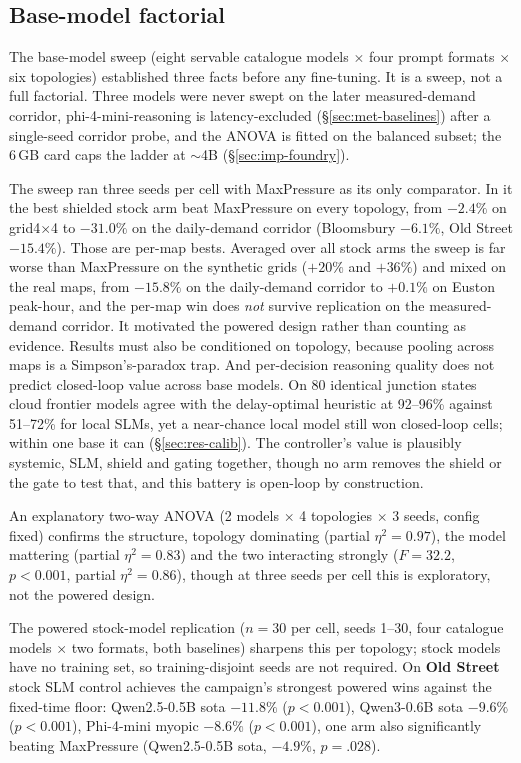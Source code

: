 \subsection{Base-model factorial}\label{sec:res-factorial}
The base-model sweep (eight servable catalogue models $\times$ four prompt
formats $\times$ six topologies) established three facts before any
fine-tuning. It is a sweep, not a full factorial. Three models were never
swept on the later measured-demand corridor, phi-4-mini-reasoning is
latency-excluded (\S\ref{sec:met-baselines}) after a single-seed corridor
probe, and the ANOVA is fitted on the balanced subset; the 6\,GB card caps
the ladder at $\sim$4B (\S\ref{sec:imp-foundry}).

The sweep ran three seeds per cell with MaxPressure as its only
comparator. In it the best shielded stock arm beat MaxPressure on every
topology, from $-2.4\%$ on grid4$\times$4 to $-31.0\%$ on the daily-demand
corridor (Bloomsbury $-6.1\%$, Old Street $-15.4\%$). Those are per-map
bests. Averaged over all stock arms the sweep is far worse than MaxPressure
on the synthetic grids ($+20\%$ and $+36\%$) and mixed on the real maps,
from $-15.8\%$ on the daily-demand corridor to $+0.1\%$ on Euston
peak-hour, and the per-map win does \emph{not} survive replication on the
measured-demand corridor. It motivated the powered design rather than
counting as evidence. Results must also be conditioned on topology,
because pooling across maps is a Simpson's-paradox trap. And per-decision
reasoning quality does not predict closed-loop value across base models.
On 80 identical junction states cloud frontier models agree with the
delay-optimal heuristic at 92--96\% against 51--72\% for local SLMs, yet a
near-chance local model still won closed-loop cells; within one base it
can (\S\ref{sec:res-calib}). The controller's value is plausibly systemic,
SLM, shield and gating together, though no arm removes the shield or the
gate to test that, and this battery is open-loop by construction.

An explanatory two-way ANOVA (2 models $\times$ 4 topologies $\times$ 3
seeds, config fixed) confirms the structure, topology dominating (partial
$\eta^2{=}0.97$), the model mattering (partial $\eta^2{=}0.83$) and the two
interacting strongly ($F{=}32.2$, $p{<}0.001$, partial $\eta^2{=}0.86$),
though at three seeds per cell this is exploratory, not the powered design.

The powered stock-model replication ($n{=}30$ per cell, seeds 1--30, four
catalogue models $\times$ two formats, both baselines) sharpens this per
topology; stock models have no training set, so training-disjoint seeds are
not required. On \textbf{Old Street} stock SLM control achieves the
campaign's strongest powered wins against the fixed-time floor:
Qwen2.5-0.5B sota $-11.8\%$ ($p{<}0.001$), Qwen3-0.6B sota $-9.6\%$
($p{<}0.001$), Phi-4-mini myopic $-8.6\%$ ($p{<}0.001$), one arm also
significantly beating MaxPressure (Qwen2.5-0.5B sota, $-4.9\%$,
$p{=}.028$).

